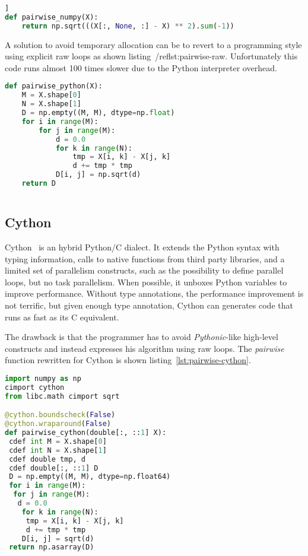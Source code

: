 \documentclass[10pt, preprint]{sigplanconf}
\begin{document}
\begin{lstlisting}[language=python, caption={\textit{pairwise} function that
  exhibits array broadcasting.}, label={lst:pairwise}, breaklines=true]]
def pairwise_numpy(X):
    return np.sqrt(((X[:, None, :] - X) ** 2).sum(-1))
\end{lstlisting}

A solution to avoid temporary allocation can be to revert to a programming style
using explicit raw loops as shown listing~/ref{lst:pairwise-raw}. Unfortunately
this code runs almost 100 times slower due to the Python interpreter overhead.

\begin{lstlisting}[language=python, caption={\textit{pairwise} function
  using raw loops.}, label={lst:pairwise-raw}]
def pairwise_python(X):
    M = X.shape[0]
    N = X.shape[1]
    D = np.empty((M, M), dtype=np.float)
    for i in range(M):
        for j in range(M):
            d = 0.0
            for k in range(N):
                tmp = X[i, k] - X[j, k]
                d += tmp * tmp
            D[i, j] = np.sqrt(d)
    return D
\end{lstlisting}



\begin{lstlisting}[language=python]

\end{lstlisting}

\subsection{Cython}
%
Cython~\cite{cython2010} is an hybrid Python/C dialect. It extends the Python
syntax with typing information, calls to native functions from third party
libraries, and a limited set of parallelism constructs, such as the possibility
to define parallel loops, but no task parallelism. When possible, it unboxes
Python variables to improve performance. Without type annotations, the
performance improvement is not terrific, but given enough type annotation,
Cython can generates code that runs as fast as its C equivalent.

The drawback is that the programmer has to avoid \textit{Pythonic}-like
high-level constructs and instead expresses his algorithm using raw loops.
The \textit{pairwise} function rewritten for Cython is shown 
listing~\ref{lst:pairwise-cython}.

\begin{lstlisting}[language=python, caption={\textit{pairwise} function 
  rewritten for Cython.}, label={lst:pairwise-cython}]
%%cython
import numpy as np
cimport cython
from libc.math cimport sqrt

@cython.boundscheck(False)
@cython.wraparound(False)
def pairwise_cython(double[:, ::1] X):
 cdef int M = X.shape[0]
 cdef int N = X.shape[1]
 cdef double tmp, d
 cdef double[:, ::1] D
 D = np.empty((M, M), dtype=np.float64)
 for i in range(M):
  for j in range(M):
   d = 0.0
    for k in range(N):
     tmp = X[i, k] - X[j, k]
     d += tmp * tmp
    D[i, j] = sqrt(d)
 return np.asarray(D)
\end{lstlisting}
\end{document}
